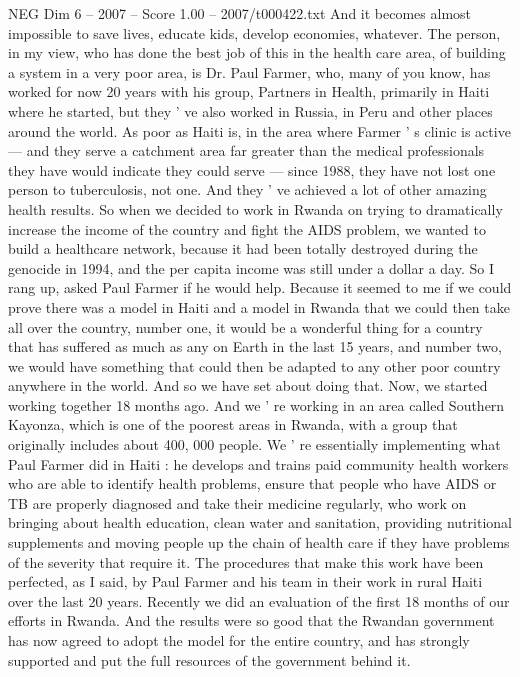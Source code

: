 \begin{textsample}{NEG Dim 6 – 2007 – Score 1.00 – 2007/t000422.txt}
And it becomes almost impossible to save lives, educate kids, develop economies, whatever.
The person, in my view, who has done the best job of this in the health care area, of building a system in a very poor area, is Dr.
Paul Farmer, who, many of you know, has worked for now 20 years with his group, Partners in Health, primarily in Haiti where he started, but they ' ve also worked in Russia, in Peru and other places around the world.
As poor as Haiti is, in the area where Farmer ' s clinic is active — and they serve a catchment area far greater than the medical professionals they have would indicate they could serve — since 1988, they have not lost one person to tuberculosis, not one.
And they ' ve achieved a lot of other amazing health results.
So when we decided to work in Rwanda on trying to dramatically increase the income of the country and fight the AIDS problem, we wanted to build a healthcare network, because it had been totally destroyed during the genocide in 1994, and the per capita income was still under a dollar a day.
So I rang up, asked Paul Farmer if he would help.
Because it seemed to me if we could prove there was a model in Haiti and a model in Rwanda that we could then take all over the country, number one, it would be a wonderful thing for a country that has suffered as much as any on Earth in the last 15 years, and number two, we would have something that could then be adapted to any other poor country anywhere in the world.
And so we have set about doing that.
Now, we started working together 18 months ago.
And we ' re working in an area called Southern Kayonza, which is one of the poorest areas in Rwanda, with a group that originally includes about 400, 000 people.
We ' re essentially implementing what Paul Farmer did in Haiti : he develops and trains paid community health workers who are able to identify health problems, ensure that people who have AIDS or TB are properly diagnosed and take their medicine regularly, who work on bringing about health education, clean water and sanitation, providing nutritional supplements and moving people up the chain of health care if they have problems of the severity that require it.
The procedures that make this work have been perfected, as I said, by Paul Farmer and his team in their work in rural Haiti over the last 20 years.
Recently we did an evaluation of the first 18 months of our efforts in Rwanda.
And the results were so good that the Rwandan government has now agreed to adopt the model for the entire country, and has strongly supported and put the full resources of the government behind it.

\end{textsample}
